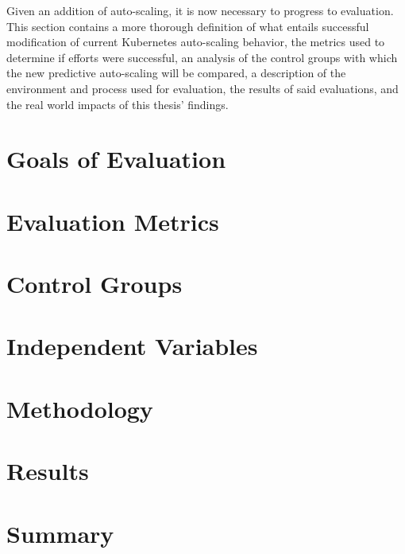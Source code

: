 Given an addition of auto-scaling, it is now necessary to progress to
evaluation. This section contains a more thorough definition of what entails
successful modification of current Kubernetes auto-scaling behavior, the metrics
used to determine if efforts were successful, an analysis of the control groups
with which the new predictive auto-scaling will be compared, a description of
the environment and process used for evaluation, the results of said
evaluations, and the real world impacts of this thesis' findings.

\section{Goals of Evaluation}



\section{Evaluation Metrics}



\section{Control Groups}



\section{Independent Variables}



\section{Methodology}



\section{Results}



\section{Summary}


